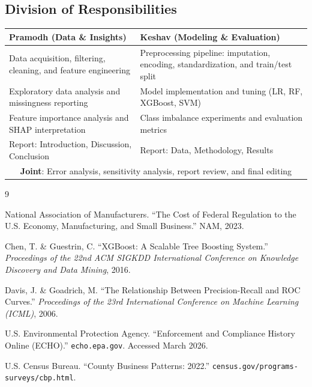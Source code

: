 \documentclass[11pt]{article}
\begin{document}
\subsection{Division of Responsibilities}

\begin{table}[H]
\centering
\begin{tabular}{p{} p{}}
\toprule
\textbf{Pramodh (Data \& Insights)} & \textbf{Keshav (Modeling \& Evaluation)} \\
\midrule
Data acquisition, filtering, cleaning, and feature engineering & Preprocessing pipeline: imputation, encoding, standardization, and train/test split \\
Exploratory data analysis and missingness reporting & Model implementation and tuning (LR, RF, XGBoost, SVM) \\
Feature importance analysis and SHAP interpretation & Class imbalance experiments and evaluation metrics \\
Report: Introduction, Discussion, Conclusion & Report: Data, Methodology, Results \\
\midrule
\multicolumn{2}{c}{\textbf{Joint}: Error analysis, sensitivity analysis, report review, and final editing} \\
\bottomrule
\end{tabular}
\end{table}


\begin{thebibliography}{9}

National Association of Manufacturers. ``The Cost of Federal Regulation to the U.S. Economy, Manufacturing, and Small Business.'' NAM, 2023.

Chen, T. \& Guestrin, C. ``XGBoost: A Scalable Tree Boosting System.'' \textit{Proceedings of the 22nd ACM SIGKDD International Conference on Knowledge Discovery and Data Mining}, 2016.

Davis, J. \& Goadrich, M. ``The Relationship Between Precision-Recall and ROC Curves.'' \textit{Proceedings of the 23rd International Conference on Machine Learning (ICML)}, 2006.

U.S. Environmental Protection Agency. ``Enforcement and Compliance History Online (ECHO).'' \texttt{echo.epa.gov}. Accessed March 2026.

U.S. Census Bureau. ``County Business Patterns: 2022.'' \texttt{census.gov/programs-surveys/cbp.html}.

\end{thebibliography}
\end{document}
